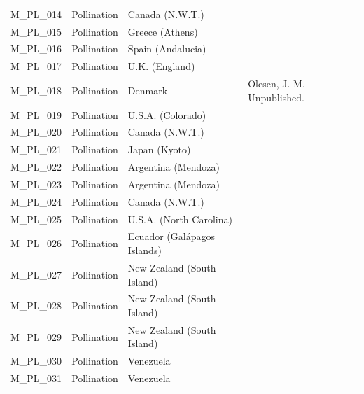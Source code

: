 \documentclass[12pt]{article}
\begin{document}
\begin{spacing}{1.5}
\begin{table}[!h]
\begin{center}
\begin{tabular}{|l l l m{8cm} |}
    M\_PL\_014  & Pollination & Canada (N.W.T.) & \citep{Hocking1968} \\
    M\_PL\_015  & Pollination & Greece (Athens) & \citep{Petanidou1991} \\
    M\_PL\_016  & Pollination & Spain (Andalucia) & \citep{Herrera1988} \\
    M\_PL\_017  & Pollination & U.K. (England) & \citep{Memmott2002} \\
    M\_PL\_018  & Pollination & Denmark & Olesen, J. M. Unpublished.  \\
    M\_PL\_019  & Pollination & U.S.A. (Colorado) & \citep{Inouye1988}  \\
    M\_PL\_020  & Pollination & Canada (N.W.T.) & \citep{Kevan1970} \\
    M\_PL\_021  & Pollination & Japan (Kyoto) & \citep{Kato1990}  \\
    M\_PL\_022  & Pollination & Argentina (Mendoza) & \citep{Medan2002} \\
    M\_PL\_023  & Pollination & Argentina (Mendoza) & \citep{Medan2002} \\
    M\_PL\_024  & Pollination & Canada (N.W.T.) & \citep{Mosquin1967} \\
    M\_PL\_025  & Pollination & U.S.A. (North Carolina) & \citep{Motten1982}  \\
    M\_PL\_026  & Pollination & Ecuador (Gal\'{a}pagos Islands) & \citep{McMullen1993}  \\
    M\_PL\_027  & Pollination & New Zealand (South Island) & \citep{Primack1983} \\
    M\_PL\_028  & Pollination & New Zealand (South Island) & \citep{Primack1983} \\
    M\_PL\_029  & Pollination & New Zealand (South Island) & \citep{Primack1983} \\
    M\_PL\_030  & Pollination & Venezuela & \citep{Ramirez1992} \\
    M\_PL\_031  & Pollination & Venezuela & \citep{Ramirez1989} \\
    \hline
    \end{tabular}
    \end{center}
    \end{table}

    \clearpage
    \newpage


\end{spacing}
\end{document}
